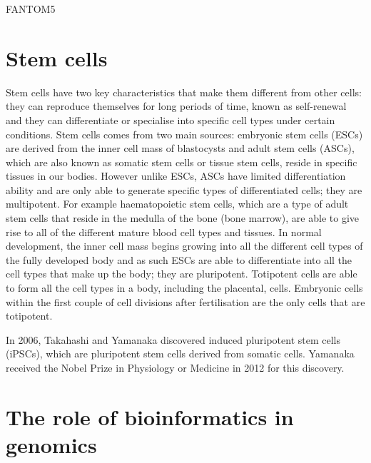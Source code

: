FANTOM5\cite{pmid24670764}

\section{Stem cells}

Stem cells have two key characteristics that make them different from other cells: they can reproduce themselves for long periods of time, known as self-renewal and they can differentiate or specialise into specific cell types under certain conditions. Stem cells comes from two main sources: embryonic stem cells (ESCs) are derived from the inner cell mass of blastocysts and adult stem cells (ASCs), which are also known as somatic stem cells or tissue stem cells, reside in specific tissues in our bodies. However unlike ESCs, ASCs have limited differentiation ability and are only able to generate specific types of differentiated cells; they are multipotent. For example haematopoietic stem cells, which are a type of adult stem cells that reside in the medulla of the bone (bone marrow), are able to give rise to all of the different mature blood cell types and tissues. In normal development, the inner cell mass begins growing into all the different cell types of the fully developed body and as such ESCs are able to differentiate into all the cell types that make up the body; they are pluripotent. Totipotent cells are able to form all the cell types in a body, including the placental, cells. Embryonic cells within the first couple of cell divisions after fertilisation are the only cells that are totipotent.

In 2006, Takahashi and Yamanaka discovered induced pluripotent stem cells (iPSCs)\cite{pmid16904174}, which are pluripotent stem cells derived from somatic cells. Yamanaka received the Nobel Prize in Physiology or Medicine in 2012 for this discovery.

\section{The role of bioinformatics in genomics}

